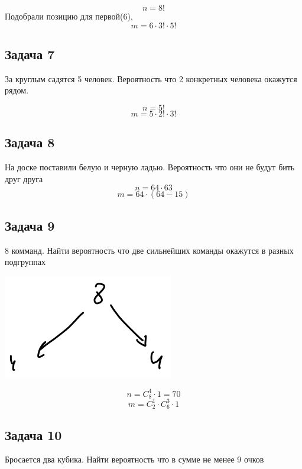 \documentclass[english]{article}
\theoremstyle{plain}
\theoremstyle{remark}
\theoremstyle{definition}
\begin{document}
\[ n = 8! \]
Подобрали позицию для первой(6),
\[ m = 6 \cdot 3!\cdot 5! \]

\subsection{Задача 7}
\label{sec:org58c4647}
За круглым садятся 5 человек. Вероятность что 2 конкретных человека окажутся рядом.

\[ n = 5! \]
\[ m = 5\cdot 2! \cdot 3! \]

\subsection{Задача 8}
\label{sec:org9ec4940}
На доске поставили белую и черную ладью. Вероятность что они не будут бить друг друга
\[ n = 64 \cdot 63 \]
\[ m = 64\cdot(64 - 15) \]

\subsection{Задача 9}
\label{sec:org824ec46}
8 комманд. Найти вероятность что две сильнейших команды окажутся в разных подгруппах

\begin{center}
\includegraphics[scale=0.5]{1_8.png}
\end{center}

\[ n = C^4_8\cdot 1 = 70 \]
\[ m = C^1_2\cdot C^3_6 \cdot 1 \]

\subsection{Задача 10}
\label{sec:orga431253}
Бросается два кубика. Найти вероятность что в сумме не менее 9 очков
\end{document}
